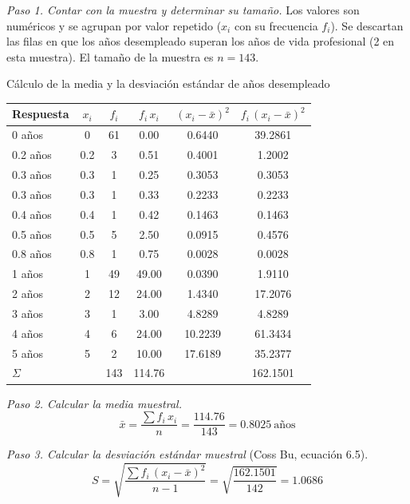 \textit{Paso 1. Contar con la muestra y determinar su tamaño.} Los valores son numéricos y se agrupan por valor repetido ($x_i$ con su frecuencia $f_i$). Se descartan las filas en que los años desempleado superan los años de vida profesional (2 en esta muestra). El tamaño de la muestra es $n = 143$.

\begin{mitabla}{Cálculo de la media y la desviación estándar de años desempleado}
\begin{tabular}{lccccc}
\toprule
Respuesta & $x_i$ & $f_i$ & $f_i\,x_i$ & $(x_i-\bar{x})^2$ & $f_i\,(x_i-\bar{x})^2$ \\
\midrule
0 años & 0 & 61 & 0.00 & 0.6440 & 39.2861 \\
0.2 años & 0.2 & 3 & 0.51 & 0.4001 & 1.2002 \\
0.3 años & 0.3 & 1 & 0.25 & 0.3053 & 0.3053 \\
0.3 años & 0.3 & 1 & 0.33 & 0.2233 & 0.2233 \\
0.4 años & 0.4 & 1 & 0.42 & 0.1463 & 0.1463 \\
0.5 años & 0.5 & 5 & 2.50 & 0.0915 & 0.4576 \\
0.8 años & 0.8 & 1 & 0.75 & 0.0028 & 0.0028 \\
1 años & 1 & 49 & 49.00 & 0.0390 & 1.9110 \\
2 años & 2 & 12 & 24.00 & 1.4340 & 17.2076 \\
3 años & 3 & 1 & 3.00 & 4.8289 & 4.8289 \\
4 años & 4 & 6 & 24.00 & 10.2239 & 61.3434 \\
5 años & 5 & 2 & 10.00 & 17.6189 & 35.2377 \\
\midrule
$\Sigma$ & & 143 & 114.76 & & 162.1501 \\
\bottomrule
\end{tabular}
\end{mitabla}

\textit{Paso 2. Calcular la media muestral.}
\[
\bar{x} = \frac{\sum f_i\,x_i}{n} = \frac{114.76}{143} = 0.8025\ \text{años}
\]

\textit{Paso 3. Calcular la desviación estándar muestral} (Coss Bu, ecuación 6.5).
\[
S = \sqrt{\frac{\sum f_i\,(x_i-\bar{x})^2}{n-1}} = \sqrt{\frac{162.1501}{142}} = 1.0686
\]

